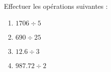 \begin{exercice*}
   Effectuer les opérations suivantes :
   \begin{enumerate}
      \item $\num{1706}\div5$
      \item $690\div25$
      \item $\num{12,6}\div3$
      \item $\num{987,72}\div2$
   \end{enumerate}
\end{exercice*}
